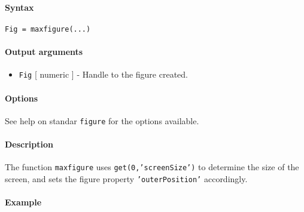 


	\paragraph{Syntax}\label{syntax}

\begin{verbatim}
Fig = maxfigure(...)
\end{verbatim}

\paragraph{Output arguments}\label{output-arguments}

\begin{itemize}
\itemsep1pt\parskip0pt
\item
  \texttt{Fig} {[} numeric {]} - Handle to the figure created.
\end{itemize}

\paragraph{Options}\label{options}

See help on standar \texttt{figure} for the options available.

\paragraph{Description}\label{description}

The function \texttt{maxfigure} uses \texttt{get(0,'screenSize')} to
determine the size of the screen, and sets the figure property
\texttt{'outerPosition'} accordingly.

\paragraph{Example}\label{example}



